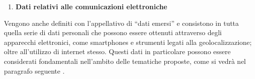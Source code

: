 \begin{enumerate}
\item  \textbf{Dati relativi alle comunicazioni elettroniche}
\end{enumerate}
Vengono anche definiti con l’appellativo di “dati emersi” e consistono in tutta quella serie di dati personali che possono essere ottenuti attraverso degli apparecchi elettronici, come smartphones e strumenti legati alla geolocalizzazione; oltre all’utilizzo di internet stesso. Questi dati in particolare possono essere considerati fondamentali nell’ambito delle tematiche proposte, come si vedrà nel paragrafo seguente . 